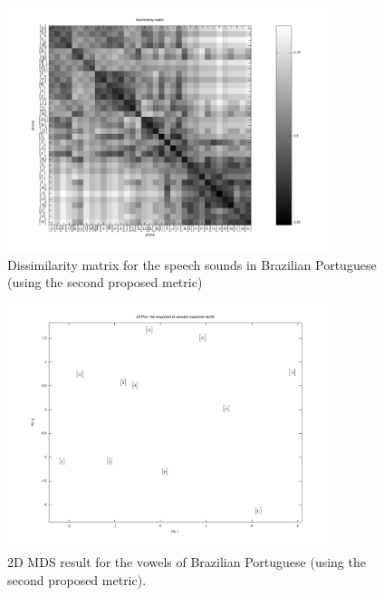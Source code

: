 \begin{figure}[h!]
\centering
\includegraphics[width=0.85\textwidth]{images/dissimilarity_PT_matrix_metric2.pdf}
\caption{Dissimilarity matrix for the speech sounds in Brazilian Portuguese (using the second proposed metric)}
\label{fig:dissimilaritymatrixM2}
\end{figure}

\begin{figure}[h!]
\centering
\includegraphics[width=0.85\textwidth]{images/mds_vowelsPT_metric2.pdf}
\caption{2D MDS result for the vowels of Brazilian Portuguese (using the second proposed metric).}
\label{fig:mds2DvowelsM2}
\end{figure}

